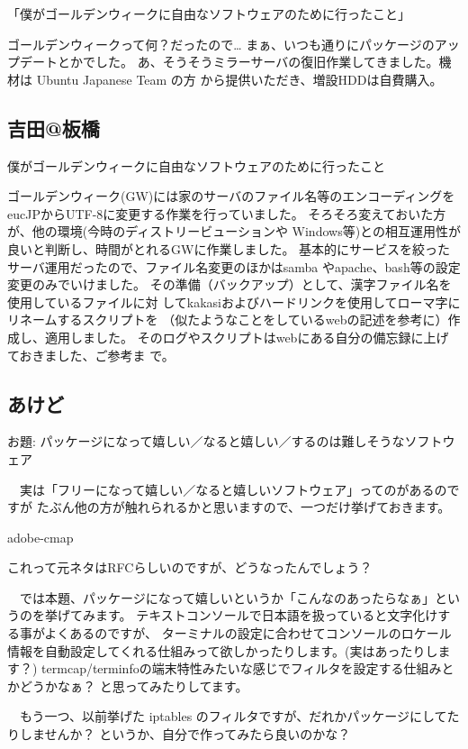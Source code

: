 \documentclass[mingoth,a4paper]{jsarticle}
\begin{document}
\begin{multicols}{2}
「僕がゴールデンウィークに自由なソフトウェアのために行ったこと」

ゴールデンウィークって何？だったので…
まぁ、いつも通りにパッケージのアップデートとかでした。
あ、そうそうミラーサーバの復旧作業してきました。機材は Ubuntu Japanese Team の方
から提供いただき、増設HDDは自費購入。

\subsection{吉田@板橋}

僕がゴールデンウィークに自由なソフトウェアのために行ったこと

ゴールデンウィーク(GW)には家のサーバのファイル名等のエンコーディングを
eucJPからUTF-8に変更する作業を行っていました。
そろそろ変えておいた方が、他の環境(今時のディストリービューションや
Windows等)との相互運用性が良いと判断し、時間がとれるGWに作業しました。
基本的にサービスを絞ったサーバ運用だったので、ファイル名変更のほかはsamba
やapache、bash等の設定変更のみでいけました。
その準備（バックアップ）として、漢字ファイル名を使用しているファイルに対
してkakasiおよびハードリンクを使用してローマ字にリネームするスクリプトを
（似たようなことをしているwebの記述を参考に）作成し、適用しました。
そのログやスクリプトはwebにある自分の備忘録に上げておきました、ご参考ま
で。


\subsection{あけど}

お題: パッケージになって嬉しい／なると嬉しい／するのは難しそうなソフトウェア

　実は「フリーになって嬉しい／なると嬉しいソフトウェア」ってのがあるのですが
たぶん他の方が触れられるかと思いますので、一つだけ挙げておきます。

adobe-cmap

これって元ネタはRFCらしいのですが、どうなったんでしょう？

　では本題、パッケージになって嬉しいというか「こんなのあったらなぁ」というのを挙げてみます。
テキストコンソールで日本語を扱っていると文字化けする事がよくあるのですが、
ターミナルの設定に合わせてコンソールのロケール情報を自動設定してくれる仕組みって欲しかったりします。(実はあったりします？)
termcap/terminfoの端末特性みたいな感じでフィルタを設定する仕組みとかどうかなぁ？
と思ってみたりしてます。

　もう一つ、以前挙げた iptables のフィルタですが、だれかパッケージにしてたりしませんか？
というか、自分で作ってみたら良いのかな？


\end{multicols}
\end{document}
